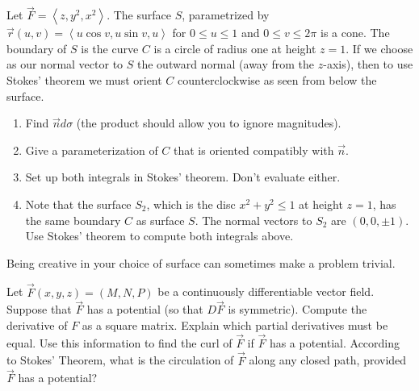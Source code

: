 \begin{problem}
Let $\vec F = \left<z,y^2,x^2\right>$. The surface $S$, parametrized by $\vec r(u,v) = \left<u\cos v,u\sin v, u\right>$ for $0\leq u\leq 1$ and $0\leq v\leq 2\pi$ is a cone. The boundary of $S$ is the curve $C$ is a circle of radius one at height $z=1$. If we choose as our normal vector to $S$ the outward normal (away from the $z$-axis), then to use Stokes' theorem we must orient $C$ counterclockwise as seen from below the surface. 
\begin{enumerate}
 \item Find $\vec n d\sigma$ (the product should allow you to ignore magnitudes). 
 \item Give a parameterization of $C$ that is oriented compatibly with $\vec n$.
 \item Set up both integrals in Stokes' theorem. Don't evaluate either.
 \item Note that the surface $S_2$, which is the disc $x^2+y^2\leq 1$ at height $z=1$, has the same boundary $C$ as surface $S$. The normal vectors to $S_2$ are $(0,0,\pm 1)$. Use Stokes' theorem to compute both integrals above. 
\end{enumerate}
Being creative in your choice of surface can sometimes make a problem trivial.
\end{problem}

\begin{problem}
 Let $\vec F(x,y,z)=(M,N,P)$ be a continuously differentiable vector field. Suppose that $\vec F$ has a potential (so that $D\vec F$ is symmetric).  Compute the derivative of $F$ as a square matrix. Explain which partial derivatives must be equal. Use this information to find the curl of $\vec F$ if $\vec F$ has a potential. According to Stokes' Theorem, what is the circulation of $\vec F$ along any closed path, provided $\vec F$ has a potential?
\end{problem}


